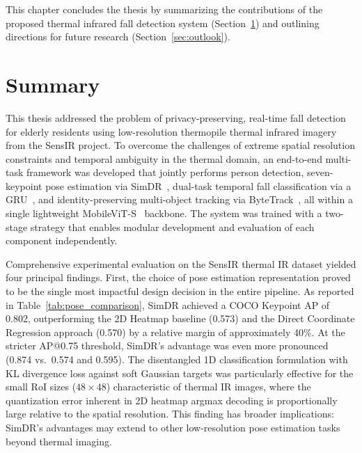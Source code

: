 \label{ch:summary}

This chapter concludes the thesis by summarizing the contributions of the proposed thermal infrared fall detection system (Section~\ref{sec:summary}) and outlining directions for future research (Section~\ref{sec:outlook}).

\section{Summary}
\label{sec:summary}

This thesis addressed the problem of privacy-preserving, real-time fall detection for elderly residents using low-resolution thermopile thermal infrared imagery from the SensIR project. To overcome the challenges of extreme spatial resolution constraints and temporal ambiguity in the thermal domain, an end-to-end multi-task framework was developed that jointly performs person detection, seven-keypoint pose estimation via SimDR~\cite{li20212d}, dual-task temporal fall classification via a GRU~\cite{cho2014learning}, and identity-preserving multi-object tracking via ByteTrack~\cite{zhang2022bytetrack}, all within a single lightweight MobileViT-S~\cite{mehta2022mobilevit} backbone. The system was trained with a two-stage strategy that enables modular development and evaluation of each component independently.

Comprehensive experimental evaluation on the SensIR thermal IR dataset yielded four principal findings. First, the choice of pose estimation representation proved to be the single most impactful design decision in the entire pipeline. As reported in Table~\ref{tab:pose_comparison}, SimDR achieved a COCO Keypoint AP of 0.802, outperforming the 2D Heatmap baseline (0.573) and the Direct Coordinate Regression approach (0.570) by a relative margin of approximately 40\%. At the stricter AP@0.75 threshold, SimDR's advantage was even more pronounced (0.874 vs.\ 0.574 and 0.595). The disentangled 1D classification formulation with KL divergence loss against soft Gaussian targets was particularly effective for the small RoI sizes ($48 \times 48$) characteristic of thermal IR images, where the quantization error inherent in 2D heatmap argmax decoding is proportionally large relative to the spatial resolution. This finding has broader implications: SimDR's advantages may extend to other low-resolution pose estimation tasks beyond thermal imaging.

